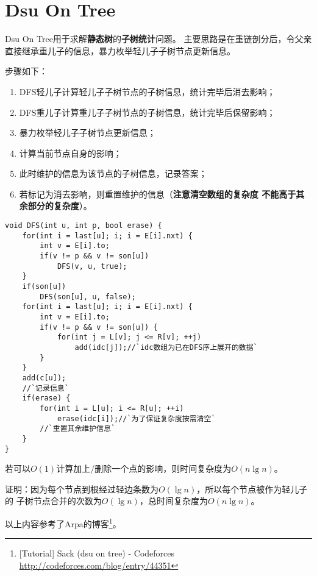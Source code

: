 \section{Dsu On Tree}\label{DOT}
Dsu On Tree用于求解{\bfseries 静态树}的{\bfseries 子树统计}问题。
主要思路是在重链剖分后，令父亲直接继承重儿子的信息，暴力枚举轻儿子子树节点更新信息。

步骤如下：
\begin{enumerate}
    \item DFS轻儿子计算轻儿子子树节点的子树信息，统计完毕后消去影响；
    \item DFS重儿子计算重儿子子树节点的子树信息，统计完毕后保留影响；
    \item 暴力枚举轻儿子子树节点更新信息；
    \item 计算当前节点自身的影响；
    \item 此时维护的信息为该节点的子树信息，记录答案；
    \item 若标记为消去影响，则重置维护的信息（{\bfseries 注意清空数组的复杂度
    不能高于其余部分的复杂度}）。
\end{enumerate}

\begin{lstlisting}[title=Dsu On Tree]
void DFS(int u, int p, bool erase) {
    for(int i = last[u]; i; i = E[i].nxt) {
        int v = E[i].to;
        if(v != p && v != son[u])
            DFS(v, u, true);
    }
    if(son[u])
        DFS(son[u], u, false);
    for(int i = last[u]; i; i = E[i].nxt) {
        int v = E[i].to;
        if(v != p && v != son[u]) {
            for(int j = L[v]; j <= R[v]; ++j)
                add(idc[j]);//`idc数组为已在DFS序上展开的数据`
        }
    }
    add(c[u]);
    //`记录信息`
    if(erase) {
        for(int i = L[u]; i <= R[u]; ++i)
            erase(idc[i]);//`为了保证复杂度按需清空`
        //`重置其余维护信息`
    }
}
\end{lstlisting}

若可以$O(1)$计算加上/删除一个点的影响，则时间复杂度为$O(n\lg n)$。

证明：因为每个节点到根经过轻边条数为$O(\lg n)$，所以每个节点被作为轻儿子的
子树节点合并的次数为$O(\lg n)$，总时间复杂度为$O(n\lg n)$。

以上内容参考了Arpa的博客\footnote{[Tutorial] Sack (dsu on tree) - Codeforces
    \url{http://codeforces.com/blog/entry/44351}
}。
